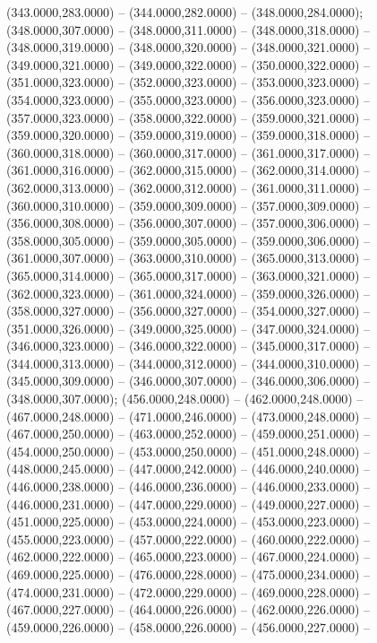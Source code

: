 \begin{scope}[draw=black,fill=cfdae61,line join=round,line width=0.208pt]
    (343.0000,283.0000) -- (344.0000,282.0000) -- (348.0000,284.0000);
   (348.0000,307.0000) -- (348.0000,311.0000) --
    (348.0000,318.0000) -- (348.0000,319.0000) -- (348.0000,320.0000) --
    (348.0000,321.0000) -- (349.0000,321.0000) -- (349.0000,322.0000) --
    (350.0000,322.0000) -- (351.0000,323.0000) -- (352.0000,323.0000) --
    (353.0000,323.0000) -- (354.0000,323.0000) -- (355.0000,323.0000) --
    (356.0000,323.0000) -- (357.0000,323.0000) -- (358.0000,322.0000) --
    (359.0000,321.0000) -- (359.0000,320.0000) -- (359.0000,319.0000) --
    (359.0000,318.0000) -- (360.0000,318.0000) -- (360.0000,317.0000) --
    (361.0000,317.0000) -- (361.0000,316.0000) -- (362.0000,315.0000) --
    (362.0000,314.0000) -- (362.0000,313.0000) -- (362.0000,312.0000) --
    (361.0000,311.0000) -- (360.0000,310.0000) -- (359.0000,309.0000) --
    (357.0000,309.0000) -- (356.0000,308.0000) -- (356.0000,307.0000) --
    (357.0000,306.0000) -- (358.0000,305.0000) -- (359.0000,305.0000) --
    (359.0000,306.0000) -- (361.0000,307.0000) -- (363.0000,310.0000) --
    (365.0000,313.0000) -- (365.0000,314.0000) -- (365.0000,317.0000) --
    (363.0000,321.0000) -- (362.0000,323.0000) -- (361.0000,324.0000) --
    (359.0000,326.0000) -- (358.0000,327.0000) -- (356.0000,327.0000) --
    (354.0000,327.0000) -- (351.0000,326.0000) -- (349.0000,325.0000) --
    (347.0000,324.0000) -- (346.0000,323.0000) -- (346.0000,322.0000) --
    (345.0000,317.0000) -- (344.0000,313.0000) -- (344.0000,312.0000) --
    (344.0000,310.0000) -- (345.0000,309.0000) -- (346.0000,307.0000) --
    (346.0000,306.0000) -- (348.0000,307.0000);
   (456.0000,248.0000) -- (462.0000,248.0000) --
    (467.0000,248.0000) -- (471.0000,246.0000) -- (473.0000,248.0000) --
    (467.0000,250.0000) -- (463.0000,252.0000) -- (459.0000,251.0000) --
    (454.0000,250.0000) -- (453.0000,250.0000) -- (451.0000,248.0000) --
    (448.0000,245.0000) -- (447.0000,242.0000) -- (446.0000,240.0000) --
    (446.0000,238.0000) -- (446.0000,236.0000) -- (446.0000,233.0000) --
    (446.0000,231.0000) -- (447.0000,229.0000) -- (449.0000,227.0000) --
    (451.0000,225.0000) -- (453.0000,224.0000) -- (453.0000,223.0000) --
    (455.0000,223.0000) -- (457.0000,222.0000) -- (460.0000,222.0000) --
    (462.0000,222.0000) -- (465.0000,223.0000) -- (467.0000,224.0000) --
    (469.0000,225.0000) -- (476.0000,228.0000) -- (475.0000,234.0000) --
    (474.0000,231.0000) -- (472.0000,229.0000) -- (469.0000,228.0000) --
    (467.0000,227.0000) -- (464.0000,226.0000) -- (462.0000,226.0000) --
    (459.0000,226.0000) -- (458.0000,226.0000) -- (456.0000,227.0000) --

\end{scope}

